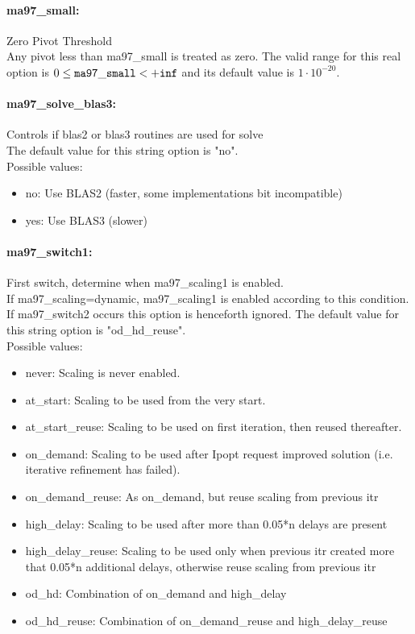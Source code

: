 \paragraph{ma97\_small:}\label{opt:ma97_small} Zero Pivot Threshold \\
 Any pivot less than ma97\_small is treated as zero. The valid range for this real option is 
$0 \le {\tt ma97\_small } <  {\tt +inf}$
and its default value is $1 \cdot 10^{-20}$.


\paragraph{ma97\_solve\_blas3:}\label{opt:ma97_solve_blas3} Controls if blas2 or blas3 routines are used for solve \\
 The default value for this string option is "no".
\\ 
Possible values:
\begin{itemize}
   \item no: Use BLAS2 (faster, some implementations bit incompatible)
   \item yes: Use BLAS3 (slower)
\end{itemize}

\paragraph{ma97\_switch1:}\label{opt:ma97_switch1} First switch, determine when ma97\_scaling1 is enabled. \\
 If ma97\_scaling=dynamic, ma97\_scaling1 is enabled according to this condition. If ma97\_switch2 occurs this option is henceforth ignored. The default value for this string option is "od\_hd\_reuse".
\\ 
Possible values:
\begin{itemize}
   \item never: Scaling is never enabled.
   \item at\_start: Scaling to be used from the very start.
   \item at\_start\_reuse: Scaling to be used on first iteration, then reused thereafter.
   \item on\_demand: Scaling to be used after Ipopt request improved solution (i.e. iterative refinement has failed).
   \item on\_demand\_reuse: As on\_demand, but reuse scaling from previous itr
   \item high\_delay: Scaling to be used after more than 0.05*n delays are present
   \item high\_delay\_reuse: Scaling to be used only when previous itr created more that 0.05*n additional delays, otherwise reuse scaling from previous itr
   \item od\_hd: Combination of on\_demand and high\_delay
   \item od\_hd\_reuse: Combination of on\_demand\_reuse and high\_delay\_reuse
\end{itemize}


